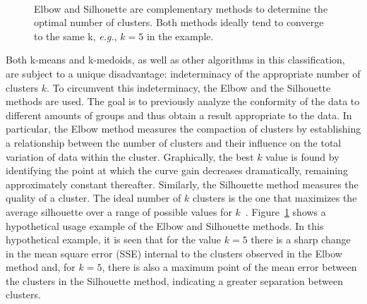 \documentclass{ieeeaccess}
\begin{document}
\begin{figure}[ht]
    \begin{center}
        \mbox{
        }
        \mbox{
        }
    \end{center}
    \caption{Elbow and Silhouette are complementary methods to determine the optimal number of clusters. Both methods ideally tend to converge to the same k, \textit{e.g.}, $k = 5$ in the example.}
    \label{fig:elbow_silhouette_ideal}
\end{figure}

Both k-means and k-medoids, as well as other algorithms in this classification, are subject to a unique disadvantage: indeterminacy of the appropriate number of clusters $ k $. To circumvent this indeterminacy, the Elbow and the Silhouette methods are used. The goal is to previously analyze the conformity of the data to different amounts of groups and thus obtain a result appropriate to the data. In particular, the Elbow method measures the compaction of clusters by establishing a relationship between the number of clusters and their influence on the total variation of data within the cluster. Graphically, the best $ k $ value is found by identifying the point at which the curve gain decreases dramatically, remaining approximately constant thereafter. Similarly, the Silhouette method measures the quality of a cluster. The ideal number of $ k $ clusters is the one that maximizes the average silhouette over a range of possible values for $ k $~\cite{ketchen1996application, rousseeuw1990finding}. Figure~\ref{fig:elbow_silhouette_ideal} shows a hypothetical usage example of the Elbow and Silhouette methods. In this hypothetical example, it is seen that for the value $ k = 5 $ there is a sharp change in the mean square error (SSE) internal to the clusters observed in the Elbow method and, for $ k = 5 $, there is also a maximum point of the mean error between the clusters in the Silhouette method, indicating a greater separation between clusters.
\end{document}
